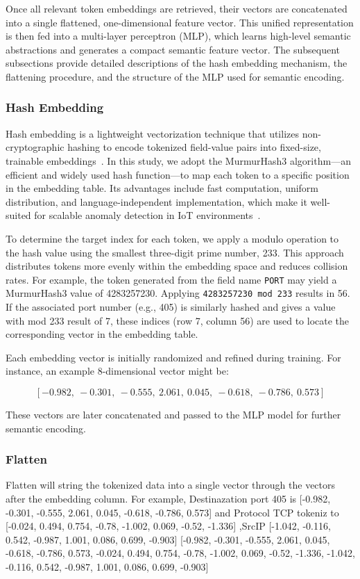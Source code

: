 \begin{ZhChapter}
    Once all relevant token embeddings are retrieved, their vectors are concatenated into a single flattened, one-dimensional feature vector. This unified representation is then fed into a multi-layer perceptron (MLP), which learns high-level semantic abstractions and generates a compact semantic feature vector. The subsequent subsections provide detailed descriptions of the hash embedding mechanism, the flattening procedure, and the structure of the MLP used for semantic encoding.

    \subsubsection{Hash Embedding}
    Hash embedding is a lightweight vectorization technique that utilizes non-cryptographic hashing to encode tokenized field-value pairs into fixed-size, trainable embeddings~\cite{weinberger2009feature}. In this study, we adopt the MurmurHash3 algorithm—an efficient and widely used hash function—to map each token to a specific position in the embedding table. Its advantages include fast computation, uniform distribution, and language-independent implementation, which make it well-suited for scalable anomaly detection in IoT environments~\cite{appleby2011murmurhash}.

    To determine the target index for each token, we apply a modulo operation to the hash value using the smallest three-digit prime number, 233. This approach distributes tokens more evenly within the embedding space and reduces collision rates. For example, the token generated from the field name \texttt{PORT} may yield a MurmurHash3 value of 4283257230. Applying \texttt{4283257230 mod 233} results in 56. If the associated port number (e.g., 405) is similarly hashed and gives a value with mod 233 result of 7, these indices (row 7, column 56) are used to locate the corresponding vector in the embedding table.

    Each embedding vector is initially randomized and refined during training. For instance, an example 8-dimensional vector might be:



    \[
        [-0.982,\ -0.301,\ -0.555,\ 2.061,\ 0.045,\ -0.618,\ -0.786,\ 0.573]
    \]



    These vectors are later concatenated and passed to the MLP model for further semantic encoding.




    \subsubsection{Flatten}
    Flatten will string the tokenized data into a single vector through the vectors after the embedding column. For example, Destinazation port 405 is [-0.982, -0.301, -0.555, 2.061, 0.045, -0.618, -0.786, 0.573] and Protocol TCP tokeniz to [-0.024, 0.494, 0.754, -0.78, -1.002, 0.069, -0.52, -1.336] ,SrcIP [-1.042, -0.116, 0.542, -0.987, 1.001, 0.086, 0.699, -0.903]
    [-0.982, -0.301, -0.555, 2.061, 0.045, -0.618, -0.786, 0.573, -0.024, 0.494, 0.754, -0.78, -1.002, 0.069, -0.52, -1.336, -1.042, -0.116, 0.542, -0.987, 1.001, 0.086, 0.699, -0.903]



\end{ZhChapter}
